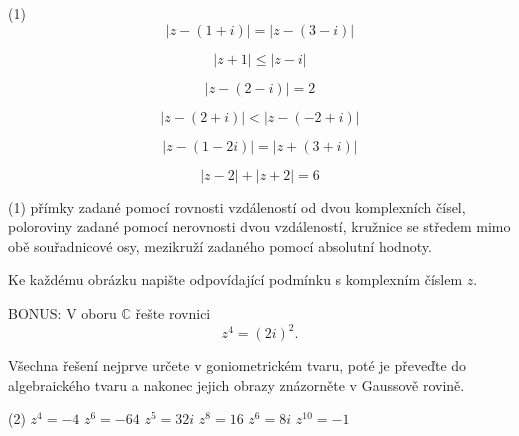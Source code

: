 \documentclass[12pt,a4paper]{article}
\begin{document}
\begin{exercise}
        \begin{tasks}(1)
            \task
            \[
                |z-(1+i)|=|z-(3-i)|
            \]

            \task
            \[
                |z+1|\leq|z-i|
            \]

            \task
            \[
                |z-(2-i)|=2
            \]

            \task
            \[
                |z-(2+i)|<|z-(-2+i)|
            \]

            \task
            \[
                |z-(1-2i)|=|z+(3+i)|
            \]

            \task
            \[
                |z-2|+|z+2|=6
            \]
        \end{tasks}
\end{exercise}


\begin{exercise}
        \begin{tasks}(1)
            \task přímky zadané pomocí rovnosti vzdáleností od dvou komplexních čísel,
            \task poloroviny zadané pomocí nerovnosti dvou vzdáleností,
            \task kružnice se středem mimo obě souřadnicové osy,
            \task mezikruží zadaného pomocí absolutní hodnoty.
        \end{tasks}

        Ke každému obrázku napište odpovídající podmínku s komplexním číslem $z$.
\end{exercise}


\begin{exercise}
    BONUS: V oboru $\mathbb{C}$ řešte rovnici
    \[
        z^4=(2i)^2.
    \]
    
    Všechna řešení nejprve určete v goniometrickém tvaru, poté je převeďte
    do algebraického tvaru a nakonec jejich obrazy znázorněte v Gaussově rovině.
\end{exercise}


\begin{exercise}
        \begin{tasks}(2)
            \task $z^4=-4$
            \task $z^6=-64$
            \task $z^5=32i$
            \task $z^8=16$
            \task $z^6=8i$
            \task $z^{10}=-1$
        \end{tasks}
\end{exercise}
\end{document}
